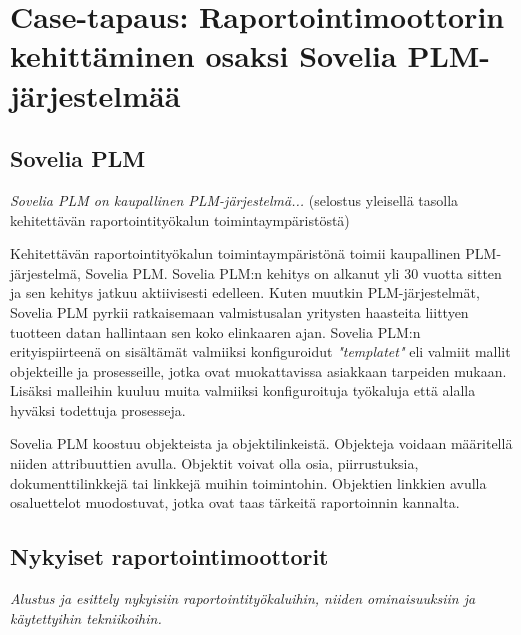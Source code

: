 \chapter{Case-tapaus: Raportointimoottorin kehittäminen osaksi Sovelia PLM-järjestelmää} \label{Case-tapaus: Raportointimoottorin kehittäminen osaksi Sovelia PLM-järjestelmää}

\section{Sovelia PLM} \label{PLM-järjestelmät}

\textit{Sovelia PLM on kaupallinen PLM-järjestelmä...} (selostus yleisellä tasolla kehitettävän raportointityökalun toimintaympäristöstä)

Kehitettävän raportointityökalun toimintaympäristönä toimii kaupallinen PLM-järjestelmä, Sovelia PLM. Sovelia PLM:n kehitys on alkanut yli 30 vuotta sitten ja sen kehitys jatkuu aktiivisesti edelleen. Kuten muutkin PLM-järjestelmät, Sovelia PLM pyrkii ratkaisemaan valmistusalan yritysten haasteita liittyen tuotteen datan hallintaan sen koko elinkaaren ajan.\cite{soveliaAboutSovelia} Sovelia PLM:n erityispiirteenä on sisältämät valmiiksi konfiguroidut \textit{"templatet"} eli valmiit mallit objekteille ja prosesseille, jotka ovat muokattavissa asiakkaan tarpeiden mukaan. Lisäksi malleihin kuuluu muita valmiiksi konfiguroituja työkaluja että alalla hyväksi todettuja prosesseja.\cite{soveliaSoveliaGetting}

Sovelia PLM koostuu objekteista ja objektilinkeistä. Objekteja voidaan määritellä niiden attribuuttien avulla. Objektit voivat olla osia, piirrustuksia, dokumenttilinkkejä tai linkkejä muihin toimintohin. Objektien linkkien avulla osaluettelot muodostuvat, jotka ovat taas tärkeitä raportoinnin kannalta.\cite{soveliaSoveliaGetting}


\section{Nykyiset raportointimoottorit}

\textit{Alustus ja esittely nykyisiin raportointityökaluihin, niiden ominaisuuksiin ja käytettyihin tekniikoihin.}

